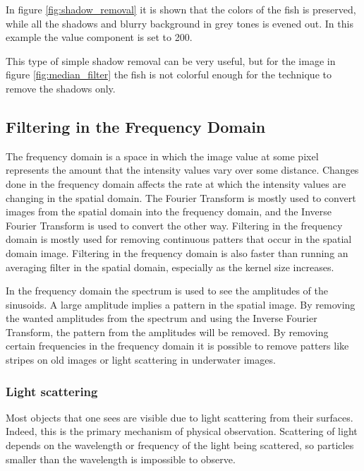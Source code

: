 In figure \ref{fig:shadow_removal} it is shown that the colors of the fish is preserved, while all the shadows and blurry background in grey tones is evened out. In this example the value component is set to 200.

This type of simple shadow removal can be very useful, but for the image in figure \ref{fig:median_filter} the fish is not colorful enough for the technique to remove the shadows only.




\subsection{Filtering in the Frequency Domain}

The frequency domain is a space in which the image value at some pixel represents the amount that the intensity values vary over some distance. Changes done in the frequency domain affects the rate at which the intensity values are changing in the spatial domain. 
The Fourier Transform is mostly used to convert images from the spatial domain into the frequency domain, and the Inverse Fourier Transform is used to convert the other way. 
Filtering in the frequency domain is mostly used for removing continuous patters that occur in the spatial domain image.
Filtering in the frequency domain is also faster than running an averaging filter in the spatial domain, especially as the kernel size increases. 

In the frequency domain the spectrum is used to see the amplitudes of the sinusoids. A large amplitude implies a pattern in the spatial image. By removing the wanted amplitudes from the spectrum and using the Inverse Fourier Transform, the pattern from the amplitudes will be removed.
By removing certain frequencies in the frequency domain it is possible to remove patters like stripes on old images or light scattering in underwater images.


\subsubsection{Light scattering}

Most objects that one sees are visible due to light scattering from their surfaces. Indeed, this is the primary mechanism of physical observation. Scattering of light depends on the wavelength or frequency of the light being scattered, so particles smaller than the wavelength is impossible to observe.\cite{website:wiki_light_scattering}

